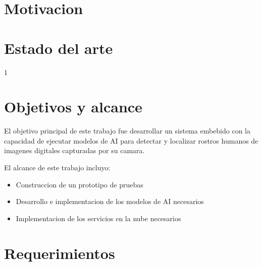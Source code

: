 \section{Motivacion}


\section{Estado del arte}1

\section{Objetivos y alcance}
El objetivo principal de este trabajo fue desarrollar un sistema embebido con la capacidad de ejecutar modelos de AI para detectar y localizar rostros humanos de imagenes digitales capturadas por su camara.

El alcance de este trabajo incluyo:
\begin{itemize}
	\item Construccion de un prototipo de pruebas
	\item Desarrollo e implementacion de los modelos de AI necesarios
	\item Implementacion de los servicios en la nube necesarios
\end{itemize}
\section{Requerimientos}



